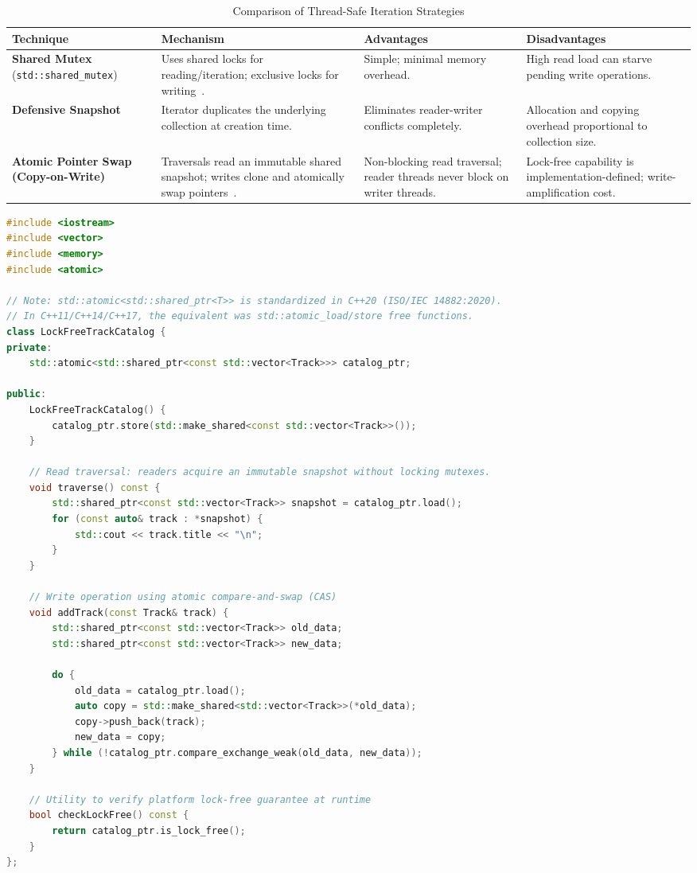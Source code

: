 \begin{table}[htbp]
\centering
\caption{Comparison of Thread-Safe Iteration Strategies}
\label{tab:thread_safe_iteration}
\begin{tabular}{@{}p{3.6cm} p{4cm} p{3.8cm} p{3.2cm}@{}}
\toprule
\textbf{Technique} & \textbf{Mechanism} & \textbf{Advantages} & \textbf{Disadvantages} \\ \midrule
\textbf{Shared Mutex} (\texttt{std::shared\_mutex}) & Uses shared locks for reading/iteration; exclusive locks for writing~\cite{williams2019}. & Simple; minimal memory overhead. & High read load can starve pending write operations. \\ \midrule
\textbf{Defensive Snapshot} & Iterator duplicates the underlying collection at creation time. & Eliminates reader-writer conflicts completely. & Allocation and copying overhead proportional to collection size. \\ \midrule
\textbf{Atomic Pointer Swap (Copy-on-Write)} & Traversals read an immutable shared snapshot; writes clone and atomically swap pointers~\cite{williams2019, iso_cpp20}. & Non-blocking read traversal; reader threads never block on writer threads. & Lock-free capability is implementation-defined; write-amplification cost. \\ \bottomrule
\end{tabular}
\end{table}

\begin{lstlisting}[language=C++, caption={Copy-on-Write Snapshot Traversal in C++20}]
#include <iostream>
#include <vector>
#include <memory>
#include <atomic>

// Note: std::atomic<std::shared_ptr<T>> is standardized in C++20 (ISO/IEC 14882:2020).
// In C++11/C++14/C++17, the equivalent was std::atomic_load/store free functions.
class LockFreeTrackCatalog {
private:
    std::atomic<std::shared_ptr<const std::vector<Track>>> catalog_ptr;

public:
    LockFreeTrackCatalog() {
        catalog_ptr.store(std::make_shared<const std::vector<Track>>());
    }

    // Read traversal: readers acquire an immutable snapshot without locking mutexes.
    void traverse() const {
        std::shared_ptr<const std::vector<Track>> snapshot = catalog_ptr.load();
        for (const auto& track : *snapshot) {
            std::cout << track.title << "\n";
        }
    }

    // Write operation using atomic compare-and-swap (CAS)
    void addTrack(const Track& track) {
        std::shared_ptr<const std::vector<Track>> old_data;
        std::shared_ptr<const std::vector<Track>> new_data;

        do {
            old_data = catalog_ptr.load();
            auto copy = std::make_shared<std::vector<Track>>(*old_data);
            copy->push_back(track);
            new_data = copy;
        } while (!catalog_ptr.compare_exchange_weak(old_data, new_data));
    }

    // Utility to verify platform lock-free guarantee at runtime
    bool checkLockFree() const {
        return catalog_ptr.is_lock_free();
    }
};
\end{lstlisting}

